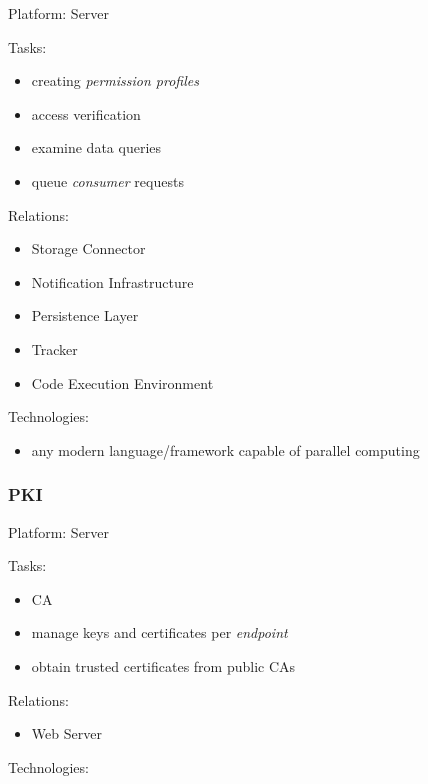 \documentclass[12pt,english,a4paper,titlepage,cleardoublepage=empty,dottedtoc]{report}
\providecommand{\tightlist}{%
  \setlength{\itemsep}{0pt}\setlength{\parskip}{0pt}}
\begin{document}
Platform: Server

Tasks:

\begin{itemize}
\tightlist
\item
  creating \emph{permission profiles}
\item
  access verification
\item
  examine data queries
\item
  queue \emph{consumer} requests
\end{itemize}

\newpage

Relations:

\begin{itemize}
\tightlist
\item
  Storage Connector
\item
  Notification Infrastructure
\item
  Persistence Layer
\item
  Tracker
\item
  Code Execution Environment
\end{itemize}

Technologies:

\begin{itemize}
\tightlist
\item
  any modern language/framework capable of parallel computing
\end{itemize}

\subsubsection*{PKI}\label{pki}

Platform: Server

Tasks:

\begin{itemize}
\tightlist
\item
  CA
\item
  manage keys and certificates per \emph{endpoint}
\item
  obtain trusted certificates from public CAs
\end{itemize}

Relations:

\begin{itemize}
\tightlist
\item
  Web Server
\end{itemize}

Technologies:
\end{document}
